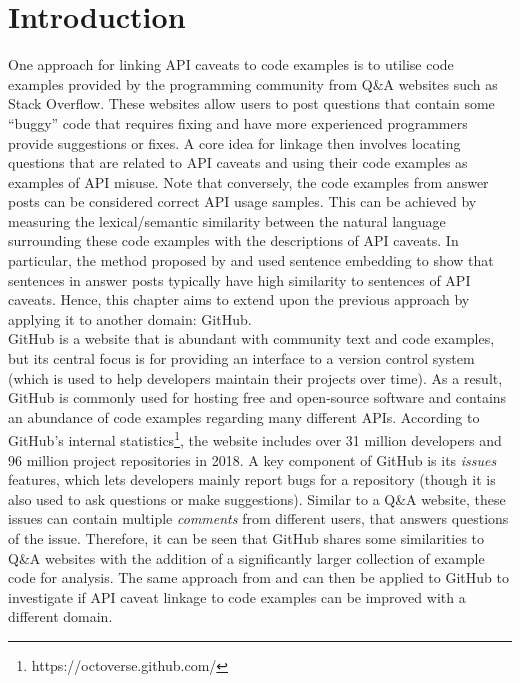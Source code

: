 \section{Introduction}
\label{sec:info-intro}
One approach for linking API caveats to code examples is to utilise code examples provided by the programming community from Q\&A websites such as Stack Overflow. These websites allow users to post questions that contain some ``buggy'' code that requires fixing and have more experienced programmers provide suggestions or fixes. A core idea for linkage then involves locating questions that are related to API caveats and using their code examples as examples of API misuse. Note that conversely, the code examples from answer posts can be considered correct API usage samples. This can be achieved by measuring the lexical/semantic similarity between the natural language surrounding these code examples with the descriptions of API caveats. In particular, the method proposed by \cite{jiamou} and \cite{xiaoxue} used sentence embedding to show that sentences in answer posts typically have high similarity to sentences of API caveats. Hence, this chapter aims to extend upon the previous approach by applying it to another domain: GitHub. \\
GitHub is a website that is abundant with community text and code examples, but its central focus is for providing an interface to a version control system (which is used to help developers maintain their projects over time). As a result, GitHub is commonly used for hosting free and open-source software and contains an abundance of code examples regarding many different APIs. According to GitHub's internal statistics\footnote{https://octoverse.github.com/}, the website includes over 31 million developers and 96 million project repositories in 2018. A key component of GitHub is its \textit{issues} features, which lets developers mainly report bugs for a repository (though it is also used to ask questions or make suggestions). Similar to a Q\&A website, these issues can contain multiple \textit{comments} from different users, that answers questions of the issue. Therefore, it can be seen that GitHub shares some similarities to Q\&A websites with the addition of a significantly larger collection of example code for analysis. The same approach from \cite{jiamou} and \cite{xiaoxue} can then be applied to GitHub to investigate if API caveat linkage to code examples can be improved with a different domain. \\
